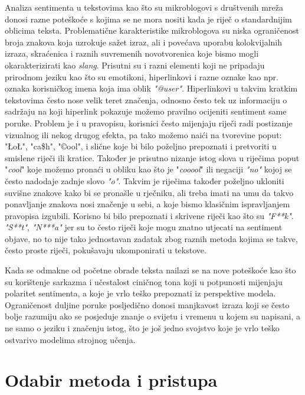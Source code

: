 \documentclass[times, utf8, zavrsni]{fer}
\begin{document}
Analiza sentimenta u tekstovima kao što su mikroblogovi s društvenih mreža donosi razne poteškoće s kojima se ne mora nositi kada je riječ o standardnijim oblicima teksta. Problematične karakteristike mikroblogova su niska ograničenost broja znakova koja uzrokuje sažet izraz, ali i povećava uporabu kolokvijalnih izraza, skraćenica i raznih suvremenih novotvorenica koje bismo mogli okarakterizirati kao \emph{slang}. Prisutni su i razni elementi koji ne pripadaju prirodnom jeziku kao što su emotikoni, hiperlinkovi i razne oznake kao npr. oznaka korisničkog imena koja ima oblik \emph{"@user"}. Hiperlinkovi u takvim kratkim tekstovima često nose velik teret značenja, odnosno često tek uz informaciju o sadržaju na koji hiperlink pokazuje možemo pravilno ocijeniti sentiment same poruke. Problem je i u pravopisu, korisnici često mijenjaju riječi radi postizanje vizualnog ili nekog drugog efekta, pa tako možemo naići na tvorevine poput: "ŁoŁ", "ca\$h", "\copyright ool", i slične koje bi bilo poželjno prepoznati i pretvoriti u smislene riječi ili kratice. Također je prisutno nizanje istog slova u riječima poput "\emph{cool}" koje možemo pronaći u obliku kao što je "\emph{cooool}" ili negaciji \emph{"no"} kojoj se često nadodaje zadnje slovo \emph{"o"}. Takvim je riječima također poželjno ukloniti suvišne znakove kako bi se pronašle u rječniku, ali treba imati na umu da takvo ponavljanje znakova nosi značenje u sebi, a koje bismo klasičnim ispravljanjem pravopisa izgubili. Korisno bi bilo prepoznati i skrivene riječi kao što su \emph{"F**k"}. \emph{"S**t"}, \emph{"N***a"} jer su to često riječi koje mogu znatno utjecati na sentiment objave, no to nije tako jednostavan zadatak zbog raznih metoda kojima se takve, često proste riječi, pokušavaju ukomponirati u tekstove.

Kada se odmakne od početne obrade teksta nailazi se na nove poteškoće kao što su korištenje sarkazma i učestalost ciničnog tona koji u potpunosti mijenjaju polaritet sentimenta, a koje je vrlo teško prepoznati iz perspektive modela. Ograničenost duljine poruke posljedično donosi manjkavost izraza koji se često bolje razumiju ako se posjeduje znanje o svijetu i vremenu u kojem su napisani, a ne samo o jeziku i značenju istog, što je još jedno svojstvo koje je vrlo teško ostvarivo modelima strojnog učenja. 


\section{Odabir metoda i pristupa}
\end{document}
